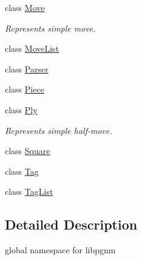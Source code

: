 \begin{DoxyCompactItemize}
class \hyperlink{classpgn_1_1Move}{Move}
\begin{DoxyCompactList}\small\item\em Represents simple move. \item\end{DoxyCompactList}\item 
class \hyperlink{classpgn_1_1MoveList}{MoveList}
\item 
class \hyperlink{classpgn_1_1Parser}{Parser}
\item 
class \hyperlink{classpgn_1_1Piece}{Piece}
\item 
class \hyperlink{classpgn_1_1Ply}{Ply}
\begin{DoxyCompactList}\small\item\em Represents simple half-\/move. \item\end{DoxyCompactList}\item 
class \hyperlink{classpgn_1_1Square}{Square}
\item 
class \hyperlink{classpgn_1_1Tag}{Tag}
\item 
class \hyperlink{classpgn_1_1TagList}{TagList}
\end{DoxyCompactItemize}


\subsection{Detailed Description}
global namespace for libpgnm 